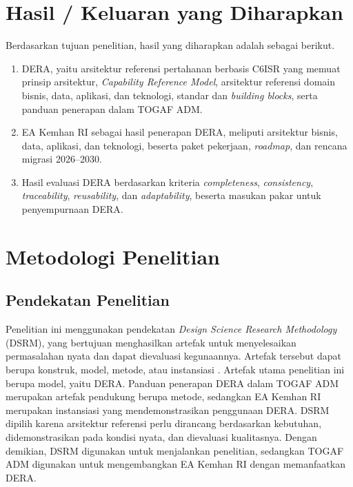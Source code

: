 \section{Hasil / Keluaran yang Diharapkan}
\label{sec:I.6}

Berdasarkan tujuan penelitian, hasil yang diharapkan adalah sebagai berikut.

\begin{enumerate}[label=\arabic*.]
\item DERA, yaitu arsitektur referensi pertahanan berbasis C6ISR yang memuat prinsip arsitektur, \textit{Capability Reference Model}, arsitektur referensi domain bisnis, data, aplikasi, dan teknologi, standar dan \textit{building blocks}, serta panduan penerapan dalam TOGAF ADM.
\item EA Kemhan RI sebagai hasil penerapan DERA, meliputi arsitektur bisnis, data, aplikasi, dan teknologi, beserta paket pekerjaan, \textit{roadmap}, dan rencana migrasi 2026–2030.
\item Hasil evaluasi DERA berdasarkan kriteria \textit{completeness}, \textit{consistency}, \textit{traceability}, \textit{reusability}, dan \textit{adaptability}, beserta masukan pakar untuk penyempurnaan DERA.
\end{enumerate}

\section{Metodologi Penelitian}
\label{sec:I.7}

\subsection{Pendekatan Penelitian}
\label{sec:I.7.1}

Penelitian ini menggunakan pendekatan \textit{Design Science Research Methodology} (DSRM\label{sk:DSRM}), yang bertujuan menghasilkan artefak untuk menyelesaikan permasalahan nyata dan dapat dievaluasi kegunaannya. Artefak tersebut dapat berupa konstruk, model, metode, atau instansiasi \cite{Hevner2004}. Artefak utama penelitian ini berupa model, yaitu DERA. Panduan penerapan DERA dalam TOGAF ADM merupakan artefak pendukung berupa metode, sedangkan EA Kemhan RI merupakan instansiasi yang mendemonstrasikan penggunaan DERA. DSRM dipilih karena arsitektur referensi perlu dirancang berdasarkan kebutuhan, didemonstrasikan pada kondisi nyata, dan dievaluasi kualitasnya. Dengan demikian, DSRM digunakan untuk menjalankan penelitian, sedangkan TOGAF ADM digunakan untuk mengembangkan EA Kemhan RI dengan memanfaatkan DERA.

